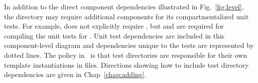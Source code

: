 In addition to the direct component dependencies illustrated in
Fig.~\ref{fig:level}, the  directory may
require additional components for its compartmentalized unit tests.  For example,
 does not explicitly require , but  and  are required for compiling the unit tests for .  Unit test dependencies are included in this component-level diagram and dependencies unique to the tests are represented by dotted lines.   
The policy in \draco\ is that
test directories are responsible for their own template instantiations in  files.
Directions showing how to include test directory dependencies are given in Chap~\ref{chap:adding}. 

